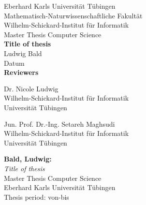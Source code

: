 \documentclass[twoside,12pt,a4paper]{report}
\begin{document}
 
\begin{titlepage}
 \begin{center}
  {\LARGE Eberhard Karls Universit\"at T\"ubingen}\\
  {\large Mathematisch-Naturwissenschaftliche Fakult\"at \\
Wilhelm-Schickard-Institut f\"ur Informatik\\[4cm]}
  {\huge Master Thesis Computer Science\\[2cm]}
  {\Large\bf  Title of thesis\\[1.5cm]}
 {\large Ludwig Bald}\\[0.5cm]
Datum\\[4cm]
{\small\bf Reviewers}\\[0.5cm]
  \parbox{7cm}{\begin{center}{\large Dr. Nicole Ludwig}\\
  {\footnotesize Wilhelm-Schickard-Institut für Informatik\\
	Universit\"at T\"ubingen}\end{center}}\hfill\parbox{7cm}{\begin{center}
  {\large Jun. Prof. Dr.-Ing. Setareh Maghsudi}\\
  {\footnotesize Wilhelm-Schickard-Institut f\"ur Informatik\\
	Universit\"at T\"ubingen}\end{center}
 }
  \end{center}
\end{titlepage}


\thispagestyle{empty}
\vspace*{\fill}
\begin{minipage}{11.2cm}
\textbf{Bald, Ludwig:}\\
\emph{Title of thesis}\\ Master Thesis Computer Science\\
Eberhard Karls Universit\"at T\"ubingen\\
Thesis period: von-bis
\end{minipage}
\newpage
\end{document}
